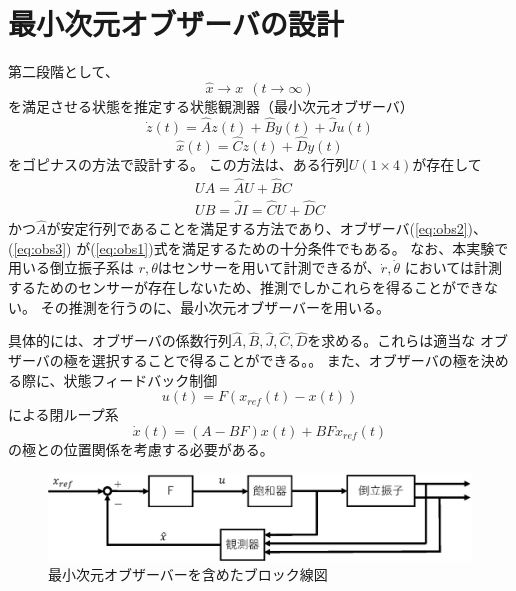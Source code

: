 \section{最小次元オブザーバの設計}
	第二段階として、
	\begin{equation}
		\hat{x}→x\ \ (t→\infty)
		\label{eq:obs1}
	\end{equation}
	を満足させる状態を推定する状態観測器（最小次元オブザーバ）
	\begin{equation}
		\dot{z}(t) = \hat{A}z(t)+\hat{B}y(t)+\hat{J}u(t)
		\label{eq:obs2}
	\end{equation}
	\begin{equation}
		\hat{x}(t) = \hat{C}z(t) + \hat{D}y(t)
		\label{eq:obs3}
	\end{equation}
	をゴピナスの方法で設計する。
	この方法は、ある行列$U(1×4)$が存在して
	\[
		\begin{array}{c}
			UA = \hat{A}U + \hat{B}C \\
			UB = \hat{J}
			I = \hat{C}U + \hat{D}C
		\end{array}
	\]
	かつ$\hat{A}$が安定行列であることを満足する方法であり、オブザーバ(\ref{eq:obs2})、(\ref{eq:obs3})
	が(\ref{eq:obs1})式を満足するための十分条件でもある。
	なお、本実験で用いる倒立振子系は
	$r,\theta$はセンサーを用いて計測できるが、$\dot{r},\dot{\theta}$
	においては計測するためのセンサーが存在しないため、推測でしかこれらを得ることができない。
	その推測を行うのに、最小次元オブザーバーを用いる。
	\par
	具体的には、オブザーバの係数行列$\hat{A},\hat{B},\hat{J},\hat{C},\hat{D}$を求める。これらは適当な
	オブザーバの極を選択することで得ることができる。。
	また、オブザーバの極を決める際に、状態フィードバック制御
	\[
		u(t) = F(x_{ref}(t)-x(t))
	\]
	による閉ループ系
	\[
		\dot{x}(t) = (A-BF)x(t) + BFx_{ref}(t)
	\]
	の極との位置関係を考慮する必要がある。
	\begin{figure}[h]
		\centering
		\includegraphics[width=0.8\linewidth]{gazo/controll_obs.eps}
		\caption{最小次元オブザーバーを含めたブロック線図}
		\label{image:cOBS}
	\end{figure}
